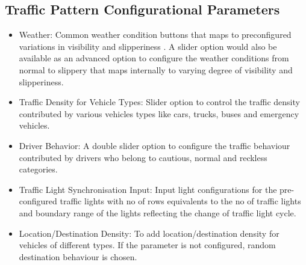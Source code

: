 \documentclass[11pt]{article}
\begin{document}
	\subsection{Traffic Pattern Configurational Parameters}
		\begin{itemize}
			\item Weather: Common weather condition buttons that maps to preconfigured variations in visibility and slipperiness . A slider option would also be available as an advanced option to configure the weather conditions from normal to slippery that maps internally to varying degree of visibility and slipperiness.
			\item Traffic Density for Vehicle Types: Slider option to control the traffic density contributed by various vehicles types like cars, trucks, buses and emergency vehicles.
			\item Driver Behavior: A double slider option to configure the traffic behaviour contributed by drivers who belong to cautious, normal and reckless categories.
			\item Traffic Light Synchronisation Input: Input light configurations for the pre-configured traffic lights with no of rows equivalents to the no of traffic lights and boundary range of the lights reflecting the change of traffic light cycle.
			\item Location/Destination Density:  To add location/destination density for vehicles of different types. If the parameter is not configured, random destination behaviour is chosen.
	\end{itemize}	
\end{document}

